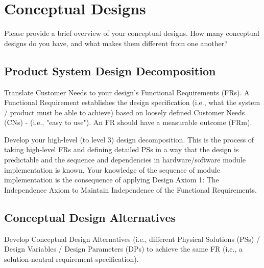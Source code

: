 \documentclass{other/docTemplate}
\begin{document}
\clearpage
\section{Conceptual Designs}
Please provide a brief overview of your conceptual designs. How many conceptual designs do you have, and what makes them different from one another?



\subsection{Product System Design Decomposition}

Translate Customer Needs to your design’s Functional Requirements (FRs). 
A Functional Requirement establishes the design specification (i.e., what the system / product must be able to achieve) based on loosely defined Customer Needs (CNs) - (i.e., "easy to use").  
An FR should have a measurable outcome (FRm).

Develop your high-level (to level 3) design decomposition. 
This is the process of taking high-level FRs and defining detailed PSs in a way that the design is predictable and the sequence and dependencies in hardware/software module implementation is known. 
Your knowledge of the sequence of module implementation is the consequence of applying Design Axiom 1: The Independence Axiom to Maintain Independence of the Functional Requirements.



\subsection{Conceptual Design Alternatives}
Develop Conceptual Design Alternatives (i.e., different Physical Solutions (PSs) / Design Variables / Design Parameters (DPs) to achieve the same FR (i.e., a solution-neutral requirement specification).\\
\end{document}
